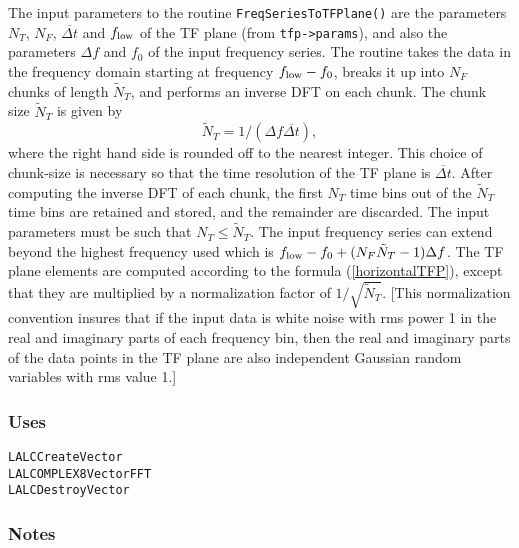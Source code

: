 The input parameters to the routine \verb+FreqSeriesToTFPlane()+ are the
parameters $N_T$, $N_F$, ${\overline {\Delta t}}$ and $f_{\rm low}$ of the TF
plane (from \verb+tfp->params+), and also the parameters $\Delta f$ and $f_0$
of the input frequency series.  The routine takes the data in the frequency
domain starting at frequency $f_{\rm low} - f_0$, breaks it up into $N_F$
chunks of length ${\tilde N}_T$, and performs an inverse DFT on each chunk.
The chunk size ${\tilde N}_T$ is given by
\begin{equation}
{\tilde N}_T =  1 /( \Delta f  {\overline {\Delta t}}),
\end{equation}
where the right hand side is rounded off to the nearest integer.  This choice
of chunk-size is necessary so that the time resolution of the TF plane is
${\overline {\Delta t}}$.  After computing the inverse DFT of each chunk, the
first $N_T$ time bins out of the ${\tilde N}_T$ time bins are retained and
stored, and the remainder are discarded.  The input parameters must be such
that $N_T \le {\tilde N}_T$.  The input frequency series can extend beyond the
highest frequency used which is $f_{\rm low} - f_0 + (N_F {\tilde N}_T
-1){\Delta f}$.  The TF plane elements are computed according to the formula
(\ref{horizontalTFP}), except that they are multiplied by a normalization
factor of $1/\sqrt{{\tilde N}_T}$.  [This normalization convention insures
that if the input data is white noise with rms power 1 in the real and
imaginary parts of each frequency bin, then the real and imaginary parts of
the data points in the TF plane are also independent Gaussian random variables
with rms value 1.]  

\subsubsection*{Uses}
\begin{verbatim}
LALCCreateVector
LALCOMPLEX8VectorFFT
LALCDestroyVector
\end{verbatim}

\subsubsection*{Notes}

\vfill{\footnotesize}
















